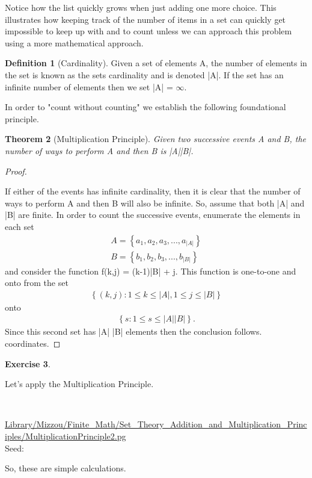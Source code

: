 \documentclass[10pt,]{book}
\theoremstyle{plain}
\newtheorem{theorem}{Theorem}[section]
\theoremstyle{definition}
\newtheorem{definition}[theorem]{Definition}
\theoremstyle{definition}
\theoremstyle{definition}
\newtheorem{exercise}[theorem]{Exercise}
\numberwithin{equation}{section}
\begin{document}
Notice how the list quickly grows when just adding one more choice. This illustrates how keeping track of the number of items in a set can quickly get impossible to keep up with and to count unless we can approach this problem using a more mathematical approach.
%
\begin{definition}[{Cardinality}]\label{definition-16}
Given a set of elements A, the number of elements in the 
		set is known as the sets cardinality and is denoted |A|. If the set has 
		an infinite number of elements then we set |A| = \(\infty\).
		\end{definition}
\par
In order to "count without counting" we establish the following 
	foundational principle.%
\begin{theorem}[{Multiplication Principle}]\label{theorem-4}
Given two successive events A and B, the number of ways 
		to perform A and then B is |A||B|.
		\end{theorem}
\begin{proof}\hypertarget{proof-4}{}
If either of the events has infinite cardinality, then it is 
			clear
			that the number of ways to perform A and then B will also be 
			infinite. So, assume that both |A| and |B| are finite.
			In order to count the successive events, enumerate the elements in
			each set
			\begin{gather*}
A = \left \{ a_1, a_2, a_3, ... , a_{|A|} \right \}\\
B = \left \{  b_1, b_2, b_3, ... , b_{|B|} \right \}
\end{gather*}
			and consider the function f(k,j) = (k-1)|B| + j. This function is 
			one-to-one and onto from the set 
			\begin{gather*}
\left \{ (k,j): 1 \le k \le |A|, 1 \le j \le |B| \right \} 
\end{gather*} 
			onto 
			\begin{gather*}
\left \{ s : 1 \le s \le |A| |B| \right \}.
\end{gather*} 
			Since this
			second set has |A| |B| elements then the conclusion follows. 
			coordinates.%
\end{proof}
\begin{exercise}\label{exercise-9}

		Let's apply the Multiplication Principle.
\par\medskip
\mbox{}\\ %
\begin{mdframed}
{}\par\vspace*{2ex}%
{\tiny\ttfamily\noindent\url{Library/Mizzou/Finite_Math/Set_Theory_Addition_and_Multiplication_Principles/MultiplicationPrinciple2.pg}\\Seed: \hfill}\end{mdframed}
\medskip\noindent 
		So, these are simple calculations.
\par
\end{exercise}
\end{document}
